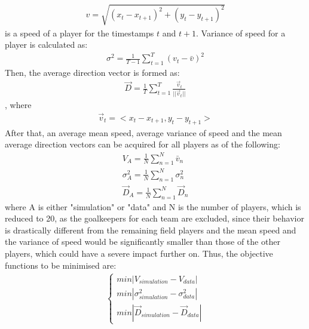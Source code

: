 \begin{align}
    v = \sqrt{(x_t - x_{t+1})^2 + (y_t - y_{t+1})^2}
\end{align}
is a speed of a player for the timestamps $t$ and $t+1$. Variance of speed for a player is calculated as:
\begin{align}
    \sigma^2 = \frac{1}{T-1}\sum_{t = 1}^{T}(v_t - \bar v)^2
\end{align}
Then, the average direction vector is formed as:
\begin{align}
    \vec D = \frac{1}{T}\sum_{t=1}^{T}\frac{\vec v_t}{||\vec v_t||}
\end{align}, where 
\begin{align}
    \vec v_t = <x_t - x_{t+1}, y_t - y_{t+1}>
\end{align}
After that, an average mean speed, average variance of speed and the mean average direction vectors can be acquired for all players as of the following:
\begin{align}
    V_A= \frac{1}{N}\sum_{n=1}^{N}\bar v_n \\
    \sigma_A^2 = \frac{1}{N}\sum_{n=1}^{N} \sigma_n^2 \\
    \vec D_A = \frac{1}{N}\sum_{n=1}^{N} \vec D_n
\end{align} where A is either "simulation" or "data" and N is the number of players, which is reduced to 20, as the goalkeepers for each team are excluded, since their behavior is drastically different from the remaining field players and the mean speed and the variance of speed would be significantly smaller than those of the other players, which could have a severe impact further on. Thus, the objective functions to be minimised are:
\begin{align}
    \begin{cases}
    min{|V_{simulation} - V_{data}|} \\
    min{|\sigma_{simulation}^2 - \sigma_{data}^2|} \\
    min{|\vec D_{simulation} - \vec D_{data}|}
    \end{cases}
\end{align}
